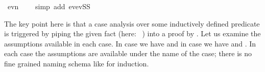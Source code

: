 \begin{isabellebody}
\ {}ev{}n\ {}\ {}{}{}\ \isamarkupfalse%
\ {}simp\ add{}\ ev{}evSS{}\isanewline
\ \ \isamarkupfalse%
%
\endisatagproof
{\isafoldproof}%
%
\isadelimproof
%
\endisadelimproof
%
\begin{isamarkuptext}%
The key point here is that a case analysis over some inductively
defined predicate is triggered by piping the given fact
(here: ~) into a proof by .
Let us examine the assumptions available in each case. In case 
we have  and in case  we have 
and . In each case the assumptions are available under the name
of the case; there is no fine grained naming schema like for induction.


\end{isamarkuptext}
\end{isabellebody}
